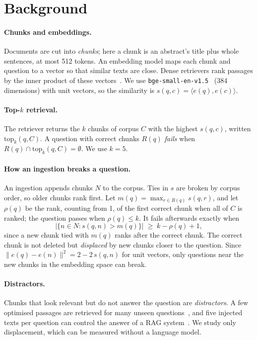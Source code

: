 \section{Background}
\label{sec:background}

\paragraph{Chunks and embeddings.}
Documents are cut into \emph{chunks}; here a chunk is an abstract's title
plus whole sentences, at most 512 tokens. An embedding model maps each
chunk and question to a vector so that similar texts are close. Dense
retrievers rank passages by the inner product of these
vectors~\cite{karpukhin2020dpr}. We use
\texttt{bge-small-en-v1.5}~\cite{xiao2024cpack} (384 dimensions) with unit
vectors, so the similarity is $s(q,c) = \langle e(q), e(c) \rangle$.

\paragraph{Top-$k$ retrieval.}
The retriever returns the $k$ chunks of corpus $C$ with the highest $s(q,c)$,
written $\mathrm{top}_k(q,C)$. A question with correct chunks $R(q)$
\emph{fails} when $R(q) \cap \mathrm{top}_k(q,C) = \emptyset$. We use $k=5$.

\paragraph{How an ingestion breaks a question.}
An ingestion appends chunks $N$ to the corpus. Ties in $s$ are broken by
corpus order, so older chunks rank first. Let $m(q) = \max_{r \in R(q)} s(q,r)$,
and let $\rho(q)$ be the rank, counting from 1, of the first correct chunk when
all of $C$ is ranked; the question passes when $\rho(q) \le k$. It fails
afterwards exactly when
\[
  \bigl|\{ n \in N : s(q,n) > m(q) \}\bigr| \;\ge\; k - \rho(q) + 1 ,
\]
since a new chunk tied with $m(q)$ ranks after the correct chunk. The correct
chunk is not deleted but
\emph{displaced} by new chunks closer to the question. Since
$\|e(q)-e(n)\|^2 = 2 - 2\,s(q,n)$ for unit vectors, only questions near the
new chunks in the embedding space can break.

\paragraph{Distractors.}
Chunks that look relevant but do not answer the question are
\emph{distractors}. A few optimised passages are retrieved for many unseen
questions~\cite{zhong2023poisoning}, and five injected texts per question
can control the answer of a RAG system~\cite{zou2025poisonedrag}. We study
only displacement, which can be measured without a language model.
